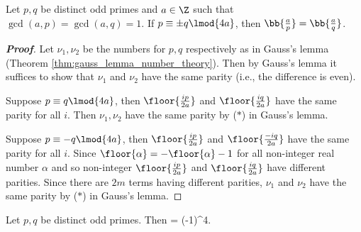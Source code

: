 \begin{lemma}\label{lem:distinct_odd_primes_pm_congruence_legendre_symbol}
Let $p,q$ be distinct odd primes and $a\in \Z$ such that $\gcd(a,p) = \gcd(a,q)=1$. If $p\equiv \pm q\lmod{4a}$, then $\bb{\frac ap} = \bb{\frac aq}$.
\end{lemma}

\begin{proof}[\bf Proof]
Let $\nu_1,\nu_2$ be the numbers for $p,q$ respectively as in Gauss's lemma (Theorem \ref{thm:gauss_lemma_number_theory}). Then by Gauss's lemma it suffices to show that $\nu_1$ and $\nu_2$ have the same parity (i.e., the difference is even). 

Suppose $p\equiv q \lmod{4a}$, then $\floor{\frac{ip}{2a}}$ and $\floor{\frac{iq}{2a}}$ have the same parity for all $i$. Then $\nu_1,\nu_2$ have the same parity by ($*$) in Gauss's lemma.

Suppose $p\equiv -q\lmod{4a}$, then $\floor{\frac{ip}{2a}}$ and $\floor{\frac{-iq}{2a}}$ have the same parity for all $i$. Since $\floor{\alpha} = -\floor{\alpha}-1$ for all non-integer real number $\alpha$ and so non-integer $\floor{\frac{ip}{2a}}$ and $\floor{\frac{iq}{2a}}$ have different parities. Since there are $2m$ terms having different parities, $\nu_1$ and $\nu_2$ have the same parity by ($*$) in Gauss's lemma.
\end{proof}

\begin{theorem}\label{thm:law_of_quadratic_reciprocity_legendre_symbol}
Let $p,q$ be distinct odd primes. Then
\be
{}  = (-1)^{4}.
\ee
\end{theorem}

